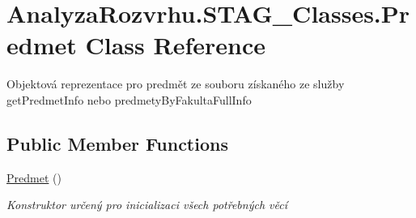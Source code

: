 \hypertarget{class_analyza_rozvrhu_1_1_s_t_a_g___classes_1_1_predmet}{}\section{Analyza\+Rozvrhu.\+S\+T\+A\+G\+\_\+\+Classes.\+Predmet Class Reference}
\label{class_analyza_rozvrhu_1_1_s_t_a_g___classes_1_1_predmet}


Objektová reprezentace pro predmět ze souboru získaného ze služby get\+Predmet\+Info nebo predmety\+By\+Fakulta\+Full\+Info  


\subsection*{Public Member Functions}
\begin{DoxyCompactItemize}
\item 
\hyperlink{class_analyza_rozvrhu_1_1_s_t_a_g___classes_1_1_predmet_a8802c22749dcf87a678ed3e45bf16690}{Predmet} ()
\begin{DoxyCompactList}\small\item\em Konstruktor určený pro inicializaci všech potřebných věcí \end{DoxyCompactList}\end{DoxyCompactItemize}
